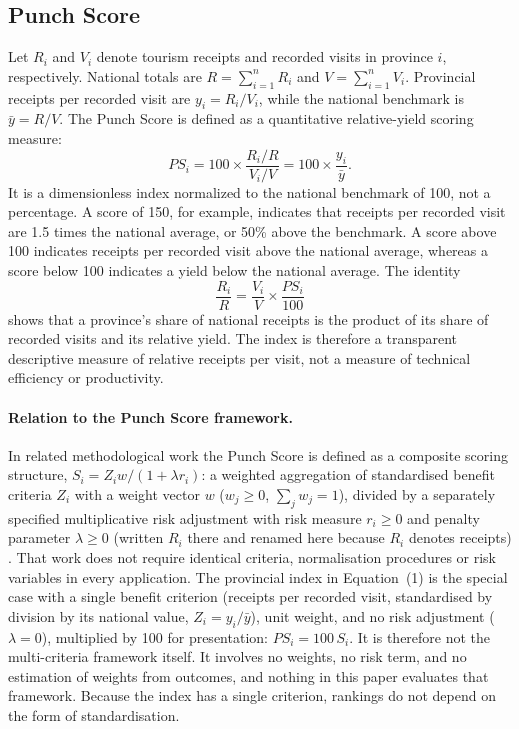 \documentclass[11pt,a4paper]{article}
\newcommand{\PS}{\mathit{PS}}
\theoremstyle{plain}\newtheorem{proposition}{Proposition}
\theoremstyle{definition}\newtheorem{definition}{Definition}
\begin{document}
\subsection{Punch Score}\label{sec:ps}
Let $R_i$ and $V_i$ denote tourism receipts and recorded visits in province $i$, respectively. National totals are $R=\sum_{i=1}^n R_i$ and $V=\sum_{i=1}^n V_i$. Provincial receipts per recorded visit are $y_i=R_i/V_i$, while the national benchmark is $\bar y=R/V$. The Punch Score is defined as a quantitative relative-yield scoring measure:
\begin{equation}
\PS_i=100\times\frac{R_i/R}{V_i/V}=100\times\frac{y_i}{\bar y}.
\end{equation}
It is a dimensionless index normalized to the national benchmark of 100, not a percentage. A score of 150, for example, indicates that receipts per recorded visit are 1.5 times the national average, or 50\% above the benchmark. A score above 100 indicates receipts per recorded visit above the national average, whereas a score below 100 indicates a yield below the national average. The identity
\begin{equation}
\frac{R_i}{R}=\frac{V_i}{V}\times\frac{\PS_i}{100}
\end{equation}
shows that a province's share of national receipts is the product of its share of recorded visits and its relative yield. The index is therefore a transparent descriptive measure of relative receipts per visit, not a measure of technical efficiency or productivity.

\paragraph{Relation to the Punch Score framework.} In related methodological work the Punch Score is defined as a composite scoring structure, $S_i=Z_iw/(1+\lambda r_i)$: a weighted aggregation of standardised benefit criteria $Z_i$ with a weight vector $w$ ($w_j\ge0$, $\sum_j w_j=1$), divided by a separately specified multiplicative risk adjustment with risk measure $r_i\ge0$ and penalty parameter $\lambda\ge0$ (written $R_i$ there and renamed here because $R_i$ denotes receipts) \citep{anon2026b,anon2026}. That work does not require identical criteria, normalisation procedures or risk variables in every application. The provincial index in Equation~(1) is the special case with a single benefit criterion (receipts per recorded visit, standardised by division by its national value, $Z_i=y_i/\bar y$), unit weight, and no risk adjustment ($\lambda=0$), multiplied by 100 for presentation: $\PS_i=100\,S_i$. It is therefore not the multi-criteria framework itself. It involves no weights, no risk term, and no estimation of weights from outcomes, and nothing in this paper evaluates that framework. Because the index has a single criterion, rankings do not depend on the form of standardisation.
\end{document}
